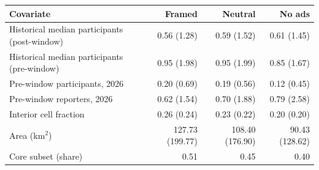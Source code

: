\begin{tabular}{lrrr}
\toprule
Covariate & Framed & Neutral & No ads \\
\midrule
Historical median participants (post-window) & 0.56 (1.28) & 0.59 (1.52) & 0.61 (1.45) \\
Historical median participants (pre-window) & 0.95 (1.98) & 0.95 (1.99) & 0.85 (1.67) \\
Pre-window participants, 2026 & 0.20 (0.69) & 0.19 (0.56) & 0.12 (0.45) \\
Pre-window reporters, 2026 & 0.62 (1.54) & 0.70 (1.88) & 0.79 (2.58) \\
Interior cell fraction & 0.26 (0.24) & 0.23 (0.22) & 0.20 (0.20) \\
Area (km$^2$) & 127.73 (199.77) & 108.40 (176.90) & 90.43 (128.62) \\
Core subset (share) & 0.51 & 0.45 & 0.40 \\
\bottomrule
\end{tabular}
